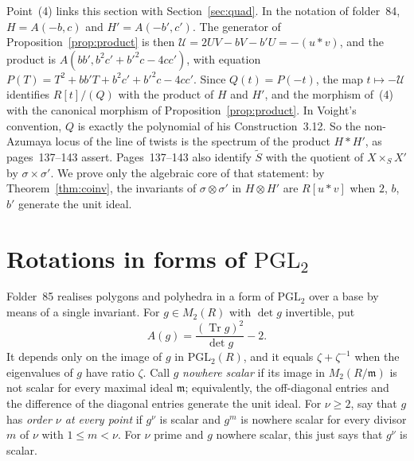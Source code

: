 \documentclass[11pt,a4paper]{amsart}
\theoremstyle{definition}
\theoremstyle{remark}
\newcommand{\PGL}{\mathrm{PGL}_2}
\newcommand{\Tr}{\operatorname{Tr}}
\begin{document}
Point~(4) links this section with Section~\ref{sec:quad}. In the notation of folder~84, $H = A(-b, c)$ and $H' = A(-b', c')$. The generator of Proposition~\ref{prop:product} is then $\mathcal U = 2UV - bV - b'U = -(u * v)$, and the product is $A(bb', b^2c' + b'^2c - 4cc')$, with equation $P(T) = T^2 + bb'T + b^2c' + b'^2c - 4cc'$. Since $Q(t) = P(-t)$, the map $t \mapsto -\mathcal U$ identifies $R[t]/(Q)$ with the product of $H$ and $H'$, and the morphism of~(4) with the canonical morphism of Proposition~\ref{prop:product}. In Voight's convention, $Q$ is exactly the polynomial of his Construction~3.12. So the non-Azumaya locus of the line of twists is the spectrum of the product $H * H'$, as pages~137--143 assert. Pages~137--143 also identify $\widetilde S$ with the quotient of $X \times_S X'$ by $\sigma \times \sigma'$. We prove only the algebraic core of that statement: by Theorem~\ref{thm:coinv}, the invariants of $\sigma\otimes\sigma'$ in $H \otimes H'$ are $R[u * v]$ when $2$, $b$, $b'$ generate the unit ideal.

\section{Rotations in forms of \texorpdfstring{$\mathrm{PGL}_2$}{PGL2}}\label{sec:pgl}

Folder~85 realises polygons and polyhedra in a form of $\PGL$ over a base by means of a single invariant. For $g \in M_2(R)$ with $\det g$ invertible, put
\[
A(g) = \frac{(\Tr g)^2}{\det g} - 2.
\]
It depends only on the image of $g$ in $\PGL(R)$, and it equals $\zeta + \zeta^{-1}$ when the eigenvalues of $g$ have ratio $\zeta$. Call $g$ \emph{nowhere scalar} if its image in $M_2(R/\mathfrak m)$ is not scalar for every maximal ideal $\mathfrak m$; equivalently, the off-diagonal entries and the difference of the diagonal entries generate the unit ideal. For $\nu \ge 2$, say that $g$ has \emph{order $\nu$ at every point} if $g^\nu$ is scalar and $g^m$ is nowhere scalar for every divisor $m$ of $\nu$ with $1 \le m < \nu$. For $\nu$ prime and $g$ nowhere scalar, this just says that $g^\nu$ is scalar.
\end{document}
